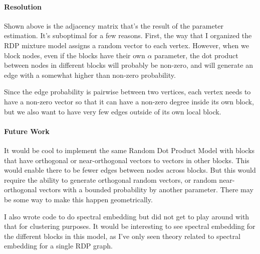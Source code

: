 \documentclass[12pt]{article}
\begin{document}
\paragraph{Resolution}
Shown above is the adjacency matrix that's the result of the parameter
estimation.  It's suboptimal for a few reasons.  First, the way that I organized
the RDP mixture model assigns a random vector to each vertex.  However, when we
block nodes, even if the blocks have their own $\alpha$ parameter, the dot
product between nodes in different blocks will probably be non-zero, and will
generate an edge with a somewhat higher than non-zero probability.

Since the edge probability is pairwise between two vertices, each vertex needs
to have a non-zero vector so that it can have a non-zero degree inside its own
block, but we also want to have very few edges outside of its own local block.

\paragraph{Future Work}
It would be cool to implement the same Random Dot Product Model with blocks that
have orthogonal or near-orthogonal vectors to vectors in other blocks.  This 
would enable there to be fewer edges between nodes across blocks.  But this 
would require the ability to generate orthogonal random vectors, or random 
near-orthogonal vectors with a bounded probability by another parameter.  There 
may be some way to make this happen geometrically.

I also wrote code to do spectral embedding but did not get to play around with
that for clustering purposes.  It would be interesting to see spectral
embedding for the different blocks in this model, as I've only seen theory
related to spectral embedding for a single RDP graph.
\newpage



\end{document}
